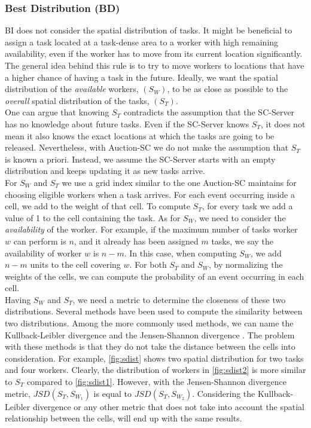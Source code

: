\subsubsection{Best Distribution (BD)}

BI does not consider the spatial distribution of tasks. It might be beneficial to assign a task located at a task-dense area to a worker with high remaining availability, even if the worker has to move from its current location significantly. The general idea behind this rule is to try to move workers to locations that have a higher chance of having a task in the future. Ideally, we want the spatial distribution of the \textit{available} workers, $(S_W)$, to be as close as possible to the \textit{overall} spatial distribution of the tasks, $(S_T)$.\\

One can argue that knowing $S_T$ contradicts the assumption that the SC-Server has no knowledge about future tasks. Even if the SC-Server knows $S_T$, it does not mean it also knows the exact locations at which the tasks are going to be released. Nevertheless, with Auction-SC we do not make the assumption that $S_T$ is known a priori. Instead, we assume the SC-Server starts with an empty distribution and keeps updating it as new tasks arrive.\\

For $S_W$ and $S_T$ we use a grid index similar to the one Auction-SC maintains for choosing eligible workers when a task arrives. For each event occurring inside a cell, we add to the weight of that cell. To compute $S_T$, for every task we add a value of 1 to the cell containing the task. As for $S_W$, we need to consider the \textit{availability} of the worker. For example, if the maximum number of tasks worker $w$ can perform is $n$, and it already has been assigned $m$ tasks, we say the availability of worker $w$ is $n-m$. In this case, when computing $S_W$, we add $n-m$ units to the cell covering $w$. For both $S_T$ and $S_W$, by normalizing the weights of the cells, we can compute the probability of an event occurring in each cell.\\

Having $S_W$ and $S_T$, we need a metric to determine the closeness of these two distributions. Several methods have been used to compute the similarity between two distributions. Among the more commonly used methods, we can name the Kullback-Leibler divergence \cite{Kullback51} and the Jensen-Shannon divergence \cite{Lin91}. The problem with these methods is that they do not take the distance between the cells into consideration. For example, \cref{fig:sdist} shows two spatial distribution for two tasks and four workers. Clearly, the distribution of workers in \cref{fig:sdist2} is more similar to $S_T$ compared to \cref{fig:sdist1}. However, with the Jensen-Shannon divergence metric, $JSD(S_T, S_{W_1})$ is equal to $JSD(S_T, S_{W_2})$. Considering the Kullback-Leibler divergence or any other metric that does not take into account the spatial relationship between the cells, will end up with the same results.\\

